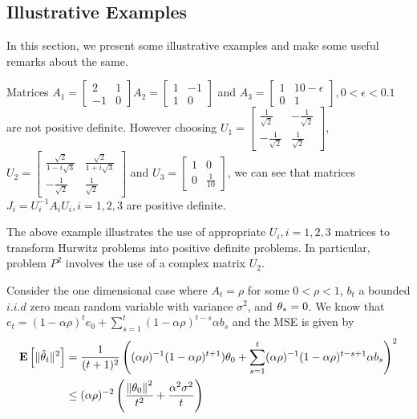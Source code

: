 \subsection{Illustrative Examples}
In this section, we present some illustrative examples and make some useful remarks about the same.
\begin{example}\label{ex:pdas}
Matrices $A_1=\begin{bmatrix} 2 &1 \\-1 &0\end{bmatrix}$$A_2=\begin{bmatrix}1 & -1\\ 1 &0 \end{bmatrix}$ and $A_3=\begin{bmatrix} 1 & 10-\epsilon \\ 0 &1 \end{bmatrix},0<\epsilon<0.1$ are not positive definite. However choosing $U_1=\begin{bmatrix} \frac{1}{\sqrt{2}}& -\frac{1}{\sqrt{2}}\\ -\frac{1}{\sqrt{2}} &\frac{1}{\sqrt{2}} \end{bmatrix}$, $U_2=\begin{bmatrix} \frac{\sqrt{2}}{1-i\sqrt{3}} & \frac{\sqrt{2}}{1+i\sqrt{3}} \\ -\frac{1}{\sqrt{2}} &\frac{1}{\sqrt{2}}\end{bmatrix}$ and $U_3=\begin{bmatrix} 1 & 0\\ 0 &\frac{1}{10} \end{bmatrix}$, we can see that matrices $J_i=U_i^{-1}A_i U_i,i=1,2,3$ are positive definite.
\end{example}
The above example  illustrates the use of appropriate $U_i,i=1,2,3$ matrices to transform Hurwitz problems into positive definite problems. In particular, problem $P^2$ involves the use of a complex matrix $U_2$.
\begin{example}\label{ex:geo}
Consider the one dimensional case where $A_t=\rho$ for some $0<\rho<1$, $b_t$ a bounded $i.i.d$ zero mean random variable with variance $\sigma^2$, and $\theta_*=0$. We know that $e_t=(1-\alpha\rho)^t e_0+\sum_{s=1}^t (1-\alpha \rho)^{t-s}\alpha b_s$ and the MSE is given by
\begin{align*}
\mathbf{E}\left[\| \hat{\theta}_t\|^2\right]&=\frac{1}{(t+1)^2}\left( (\alpha\rho)^{-1}(1-\alpha\rho)^{t+1}) \theta_0+ \sum_{s=1}^t (\alpha\rho)^{-1}(1-\alpha \rho)^{t-s+1} \alpha b_s\right)^2\\
&\leq (\alpha\rho)^{-2}\left(\frac{\left\| \theta_0\right\|^2}{t^2}+\frac{\alpha^2\sigma^2}{t}\right)
\end{align*}
\end{example}
